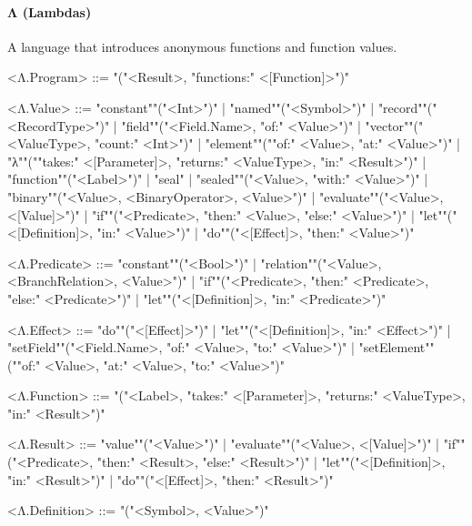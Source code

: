 \documentclass[main.tex]{subfiles}
\begin{document}
\paragraph{ Λ (Lambdas) } A language that introduces anonymous functions and function values.
\begin{grammar}
	\footnotesize
				<Λ.Program> ::=
							"("<Result>, "functions:" <[Function]>")"
				\par
				<Λ.Value> ::=
						"constant""("<Int>")"
						| "named""("<Symbol>")"
						| "record""("<RecordType>")"
						| "field""("<Field.Name>, "of:" <Value>")"
						| "vector""("<ValueType>, "count:" <Int>")"
						| "element""(""of:" <Value>, "at:" <Value>")"
						| "λ""(""takes:" <[Parameter]>, "returns:" <ValueType>, "in:" <Result>")"
						| "function""("<Label>")"
						| "seal"
						| "sealed""("<Value>, "with:" <Value>")"
						| "binary""("<Value>, <BinaryOperator>, <Value>")"
						| "evaluate""("<Value>, <[Value]>")"
						| "if""("<Predicate>, "then:" <Value>, "else:" <Value>")"
						| "let""("<[Definition]>, "in:" <Value>")"
						| "do""("<[Effect]>, "then:" <Value>")"
				\par
				<Λ.Predicate> ::=
						"constant""("<Bool>")"
						| "relation""("<Value>, <BranchRelation>, <Value>")"
						| "if""("<Predicate>, "then:" <Predicate>, "else:" <Predicate>")"
						| "let""("<[Definition]>, "in:" <Predicate>")"
				\par
				<Λ.Effect> ::=
						"do""("<[Effect]>")"
						| "let""("<[Definition]>, "in:" <Effect>")"
						| "setField""("<Field.Name>, "of:" <Value>, "to:" <Value>")"
						| "setElement""(""of:" <Value>, "at:" <Value>, "to:" <Value>")"
				\par
				<Λ.Function> ::=
							"("<Label>, "takes:" <[Parameter]>, "returns:" <ValueType>, "in:" <Result>")"
				\par
				<Λ.Result> ::=
						"value""("<Value>")"
						| "evaluate""("<Value>, <[Value]>")"
						| "if""("<Predicate>, "then:" <Result>, "else:" <Result>")"
						| "let""("<[Definition]>, "in:" <Result>")"
						| "do""("<[Effect]>, "then:" <Result>")"
				\par
				<Λ.Definition> ::=
							"("<Symbol>, <Value>")"
				\par
\end{grammar}
\par
\end{document}
